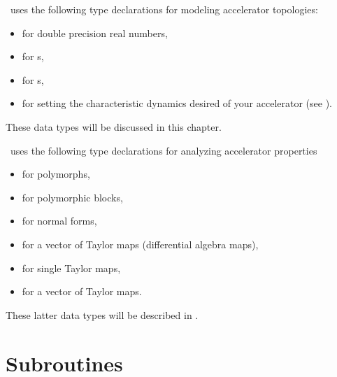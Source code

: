 
\PTC\ uses the following type declarations for modeling accelerator
topologies:
\begin{itemize}
  \item {} for double precision real numbers,
  \item {} for s,
  \item {} for s,
  \item {} for setting the characteristic
         dynamics desired of your accelerator (see ).
\end{itemize}
These data types will be discussed in this chapter.

\PTC\ uses the following type declarations for analyzing accelerator
properties 
\begin{itemize}
  \item {} for polymorphs,
  \item {} for polymorphic blocks,
  \item {} for normal forms,
  \item {} for a vector of Taylor maps
        (differential algebra maps),
  \item {} for single Taylor maps,
  \item {} for a vector of Taylor maps.
\end{itemize}
These latter data types will be described in .

%



\section{Subroutines}
\label{sec:geom.sub}

